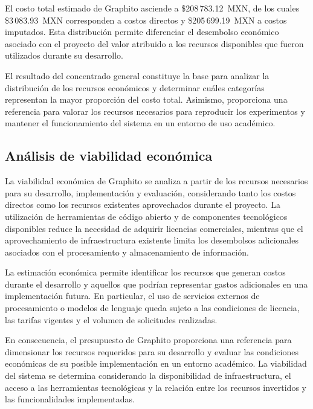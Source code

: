 El costo total estimado de Graphito asciende a \$208\,783.12~MXN, de los cuales \$3\,083.93~MXN corresponden a costos directos y \$205\,699.19~MXN a costos imputados. Esta distribución permite diferenciar el desembolso económico asociado con el proyecto del valor atribuido a los recursos disponibles que fueron utilizados durante su desarrollo.

El resultado del concentrado general constituye la base para analizar la distribución de los recursos económicos y determinar cuáles categorías representan la mayor proporción del costo total. Asimismo, proporciona una referencia para valorar los recursos necesarios para reproducir los experimentos y mantener el funcionamiento del sistema en un entorno de uso académico.

\subsection{Análisis de viabilidad económica}

La viabilidad económica de Graphito se analiza a partir de los recursos necesarios para su desarrollo, implementación y evaluación, considerando tanto los costos directos como los recursos existentes aprovechados durante el proyecto. La utilización de herramientas de código abierto y de componentes tecnológicos disponibles reduce la necesidad de adquirir licencias comerciales, mientras que el aprovechamiento de infraestructura existente limita los desembolsos adicionales asociados con el procesamiento y almacenamiento de información.

La estimación económica permite identificar los recursos que generan costos durante el desarrollo y aquellos que podrían representar gastos adicionales en una implementación futura. En particular, el uso de servicios externos de procesamiento o modelos de lenguaje queda sujeto a las condiciones de licencia, las tarifas vigentes y el volumen de solicitudes realizadas.

En consecuencia, el presupuesto de Graphito proporciona una referencia para dimensionar los recursos requeridos para su desarrollo y evaluar las condiciones económicas de su posible implementación en un entorno académico. La viabilidad del sistema se determina considerando la disponibilidad de infraestructura, el acceso a las herramientas tecnológicas y la relación entre los recursos invertidos y las funcionalidades implementadas.
